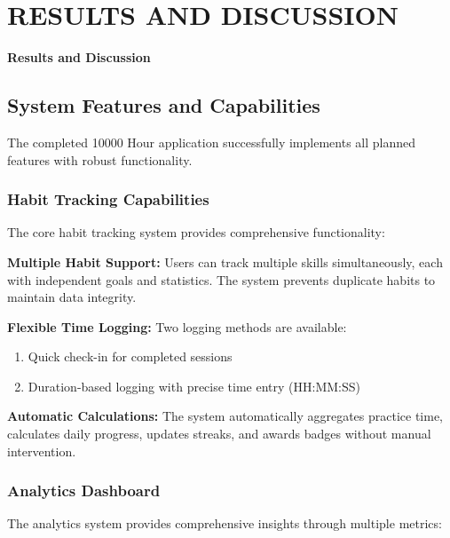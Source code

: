 \documentclass[12pt,a4paper]{report}
\newcommand{\JustifiedNormal}{\fontsize{12}{14}\selectfont\justifying\setlength{\parindent}{0pt}}
\begin{document}
\clearpage

\chapter{RESULTS AND DISCUSSION}
\begin{center}
  {\fontsize{14}{17}\selectfont\bfseries Results and Discussion}
\end{center}
\vspace{1em}

\section{System Features and Capabilities}
\JustifiedNormal
The completed 10000 Hour application successfully implements all planned features with robust functionality.

\subsection{Habit Tracking Capabilities}
\JustifiedNormal
The core habit tracking system provides comprehensive functionality:

\textbf{Multiple Habit Support:} Users can track multiple skills simultaneously, each with independent goals and statistics. The system prevents duplicate habits to maintain data integrity.

\textbf{Flexible Time Logging:} Two logging methods are available:
\begin{enumerate}
  \item Quick check-in for completed sessions
  \item Duration-based logging with precise time entry (HH:MM:SS)
\end{enumerate}

\textbf{Automatic Calculations:} The system automatically aggregates practice time, calculates daily progress, updates streaks, and awards badges without manual intervention.

\subsection{Analytics Dashboard}
\JustifiedNormal
The analytics system provides comprehensive insights through multiple metrics:
\end{document}
